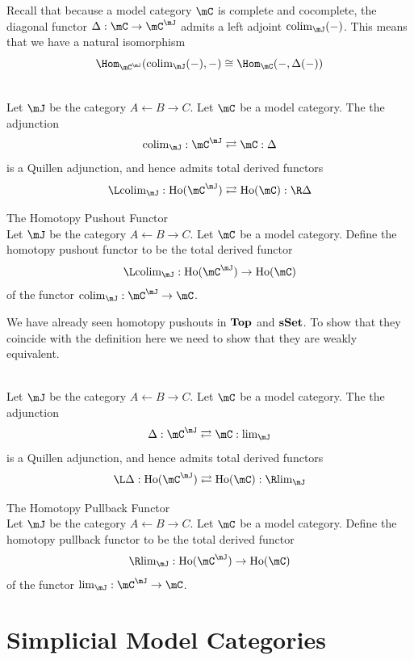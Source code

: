 \documentclass[a4paper]{article}
\begin{document}
Recall that because a model category $\mC$ is complete and cocomplete, the diagonal functor $\Delta:\mC\to\mC^\mJ$ admits a left adjoint $\text{colim}_\mJ(-)$. This means that we have a natural isomorphism $$\Hom_{\mC^\mJ}(\text{colim}_\mJ(-),-)\cong\Hom_\mC(-,\Delta(-))$$

\begin{prp}{}{}\\ Let $\mJ$ be the category $A\leftarrow B\rightarrow C$. Let $\mC$ be a model category. The the adjunction $$\text{colim}_\mJ:\mC^\mJ\rightleftarrows\mC:\Delta$$ is a Quillen adjunction, and hence admits total derived functors $$\L\text{colim}_\mJ:\text{Ho}(\mC^\mJ)\rightleftarrows\text{Ho}(\mC):\R\Delta$$
\end{prp}

\begin{defn}{The Homotopy Pushout Functor}{}\\ Let $\mJ$ be the category $A\leftarrow B\rightarrow C$. Let $\mC$ be a model category. Define the homotopy pushout functor to be the total derived functor $$\L\text{colim}_\mJ:\text{Ho}(\mC^\mJ)\to\text{Ho}(\mC)$$ of the functor $\text{colim}_\mJ:\mC^\mJ\to\mC$. 
\end{defn}

We have already seen homotopy pushouts in $\bold{Top}$ and $\bold{sSet}$. To show that they coincide with the definition here we need to show that they are weakly equivalent. 

\begin{prp}{}{}\\ Let $\mJ$ be the category $A\leftarrow B\rightarrow C$. Let $\mC$ be a model category. The the adjunction $$\Delta:\mC^\mJ\rightleftarrows\mC:\text{lim}_\mJ$$ is a Quillen adjunction, and hence admits total derived functors $$\L\Delta:\text{Ho}(\mC^\mJ)\rightleftarrows\text{Ho}(\mC):\R\text{lim}_\mJ$$
\end{prp}

\begin{defn}{The Homotopy Pullback Functor}{}\\ Let $\mJ$ be the category $A\leftarrow B\rightarrow C$. Let $\mC$ be a model category. Define the homotopy pullback functor to be the total derived functor $$\R\text{lim}_\mJ:\text{Ho}(\mC^\mJ)\to\text{Ho}(\mC)$$ of the functor $\text{lim}_\mJ:\mC^\mJ\to\mC$. 
\end{defn}


\pagebreak
\section{Simplicial Model Categories}
\end{document}
